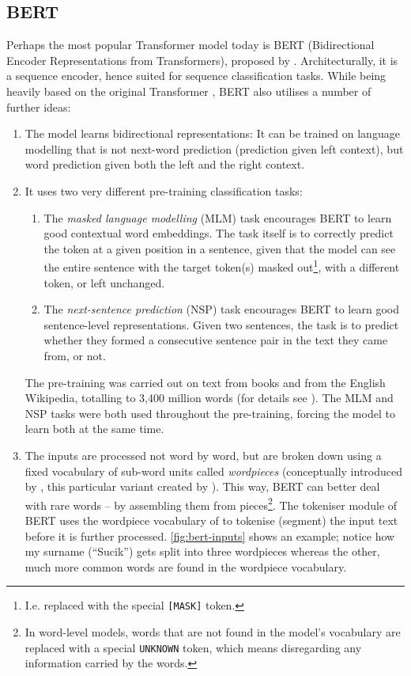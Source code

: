 \documentclass[bsc,frontabs,twoside,singlespacing,parskip,deptreport]{infthesis}
\begin{document}
{{    \subsection{BERT}{
      \label{sec:BERT}
      Perhaps the most popular Transformer model today is BERT (Bidirectional Encoder Representations from Transformers), proposed by \citet{Devlin_2018}. Architecturally, it is a sequence encoder, hence suited for sequence classification tasks. While being heavily based on the original Transformer \citep{Vaswani_2017}, BERT also utilises a number of further ideas:
      \begin{enumerate}
        \item The model learns bidirectional representations: It can be trained on language modelling that is not next-word prediction (prediction given left context), but word prediction given both the left and the right context.
        \item {It uses two very different pre-training classification tasks:
        \begin{enumerate}
          \item The \textit{masked language modelling} (MLM) task encourages BERT to learn good contextual word embeddings. The task itself is to correctly predict the token at a given position in a sentence, given that the model can see the entire sentence with the target token(s) masked out\footnote{I.e. replaced with the special \verb|[MASK]| token.}, with a different token, or left unchanged.
          \item The \textit{next-sentence prediction} (NSP) task encourages BERT to learn good sentence-level representations. Given two sentences, the task is to predict whether they formed a consecutive sentence pair in the text they came from, or not.
        \end{enumerate}
        The pre-training was carried out on text from books and from the English Wikipedia, totalling to 3,400 million words (for details see \citet{Devlin_2018}). The MLM and NSP tasks were both used throughout the pre-training, forcing the model to learn both at the same time.
        }
        \item The inputs are processed not word by word, but are broken down using a fixed vocabulary of sub-word units called \textit{wordpieces} (conceptually introduced by \citet{Sennrich_2016}, this particular variant created by \citet{Wu_2016}). This way, BERT can better deal with rare words -- by assembling them from pieces\footnote{In word-level models, words that are not found in the model's vocabulary are replaced with a special \verb|UNKNOWN| token, which means disregarding any information carried by the words.}. The tokeniser module of BERT uses the wordpiece vocabulary of \citeauthor{Wu_2016} to tokenise (segment) the input text before it is further processed. \autoref{fig:bert-inputs} shows an example; notice how my surname (``Sucik'') gets split into three wordpieces whereas the other, much more common words are found in the wordpiece vocabulary.

\end{enumerate}}}}
\end{document}
